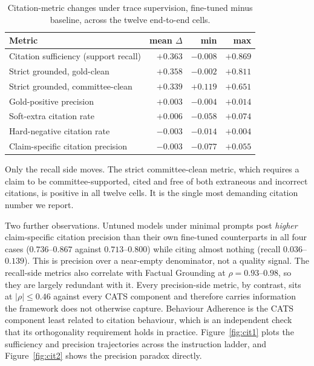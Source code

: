 \begin{table}[htbp]
\centering
{\tabstyle\setlength{\tabcolsep}{3pt}
\begin{tabular*}{\linewidth}[t]{@{\extracolsep{\fill}}lrrr@{}}\toprule
\textbf{Metric} & \textbf{mean $\Delta$} & \textbf{min} & \textbf{max}\\\midrule
Citation sufficiency (support recall) & $\mathbf{+0.363}$ & $-0.008$ & $+0.869$\\
Strict grounded, gold-clean & $\mathbf{+0.358}$ & $-0.002$ & $+0.811$\\
Strict grounded, committee-clean & $\mathbf{+0.339}$ & $\mathbf{+0.119}$ & $+0.651$\\
Gold-positive precision & $+0.003$ & $-0.004$ & $+0.014$\\
Soft-extra citation rate & $+0.006$ & $-0.058$ & $+0.074$\\
Hard-negative citation rate & $-0.003$ & $-0.014$ & $+0.004$\\
Claim-specific citation precision & $-0.003$ & $-0.077$ & $+0.055$\\
\bottomrule\end{tabular*}}
\caption{Citation-metric changes under trace supervision, fine-tuned minus
baseline, across the twelve end-to-end cells.}
\label{tab:citresults}
\end{table}

Only the recall side moves. The strict committee-clean metric, which requires a
claim to be committee-supported, cited and free of both extraneous and
incorrect citations, is positive in all twelve cells. It is the single most
demanding citation number we report.

\FloatBarrier

Two further observations. Untuned models under minimal prompts post
\emph{higher} claim-specific citation precision than their own fine-tuned
counterparts in all four cases ($0.736$--$0.867$ against $0.713$--$0.800$)
while citing almost nothing (recall $0.036$--$0.139$). This is precision over a
near-empty denominator, not a quality signal.
The recall-side metrics also correlate with Factual Grounding at
$\rho=0.93$--$0.98$, so they are largely redundant with it. Every
precision-side metric, by contrast, sits at $|\rho|\leq0.46$ against every CATS component and
therefore carries information the framework does not otherwise capture. Behaviour
Adherence is the CATS component least related to citation behaviour, which is an
independent check that its orthogonality requirement holds in practice.
Figure~\ref{fig:cit1} plots the sufficiency and precision trajectories across
the instruction ladder, and Figure~\ref{fig:cit2} shows the precision paradox
directly.





